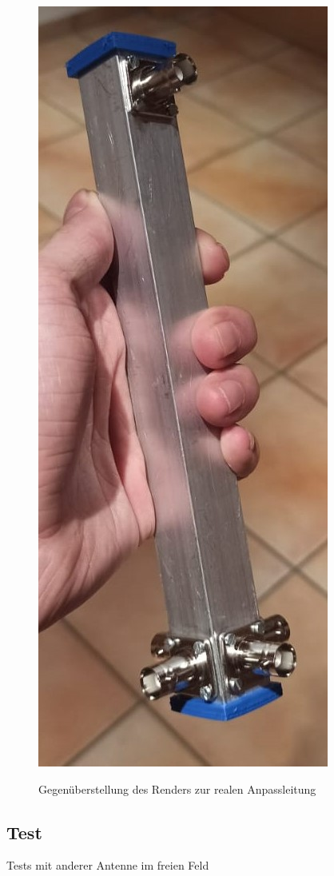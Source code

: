 \begin{figure}[H]
\begin{minipage}[b]{.2\linewidth}
		\label{fig:Anpassleitung-Render}
	\end{minipage}
	\hspace{.1\linewidth}%
	\begin{minipage}[b]{.2\linewidth} %
		\includegraphics[width=\linewidth]{../ref/Anpasstopf-real.jpeg}
		\label{fig:Anpassleitung-real}
	\end{minipage}
	\caption{Gegenüberstellung des Renders zur realen Anpassleitung}
\end{figure}

\subsection{Test}

Tests mit anderer Antenne im freien Feld